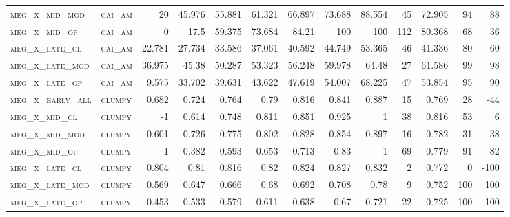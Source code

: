 \begin{landscape}
\begin{center}
\begin{footnotesize}
\begin{longtable}{llrrrrrrrr|rrr}
\textsc{meg\_x\_mid\_mod  } & \textsc{cai\_am   }   & 20       & 45.976   & 55.881   & 61.321   & 66.897   & 73.688   & 88.554    & 45     & 72.905        & 94            & 88              \\
\textsc{meg\_x\_mid\_op   } & \textsc{cai\_am   }   & 0        & 17.5     & 59.375   & 73.684   & 84.21    & 100      & 100       & 112    & 80.368        & 68            & 36              \\
\textsc{meg\_x\_late\_cl  } & \textsc{cai\_am   }   & 22.781   & 27.734   & 33.586   & 37.061   & 40.592   & 44.749   & 53.365    & 46     & 41.336        & 80            & 60              \\
\textsc{meg\_x\_late\_mod } & \textsc{cai\_am   }   & 36.975   & 45.38    & 50.287   & 53.323   & 56.248   & 59.978   & 64.48     & 27     & 61.586        & 99            & 98              \\
\textsc{meg\_x\_late\_op  } & \textsc{cai\_am   }   & 9.575    & 33.702   & 39.631   & 43.622   & 47.619   & 54.007   & 68.225    & 47     & 53.854        & 95            & 90              \\
\textsc{meg\_x\_early\_all} & \textsc{clumpy    }   & 0.682    & 0.724    & 0.764    & 0.79     & 0.816    & 0.841    & 0.887     & 15     & 0.769         & 28            & -44             \\
\textsc{meg\_x\_mid\_cl   } & \textsc{clumpy    }   & -1       & 0.614    & 0.748    & 0.811    & 0.851    & 0.925    & 1         & 38     & 0.816         & 53            & 6               \\
\textsc{meg\_x\_mid\_mod  } & \textsc{clumpy    }   & 0.601    & 0.726    & 0.775    & 0.802    & 0.828    & 0.854    & 0.897     & 16     & 0.782         & 31            & -38             \\
\textsc{meg\_x\_mid\_op   } & \textsc{clumpy    }   & -1       & 0.382    & 0.593    & 0.653    & 0.713    & 0.83     & 1         & 69     & 0.779         & 91            & 82              \\
\textsc{meg\_x\_late\_cl  } & \textsc{clumpy    }   & 0.804    & 0.81     & 0.816    & 0.82     & 0.824    & 0.827    & 0.832     & 2      & 0.772         & 0             & -100            \\
\textsc{meg\_x\_late\_mod } & \textsc{clumpy    }   & 0.569    & 0.647    & 0.666    & 0.68     & 0.692    & 0.708    & 0.78      & 9      & 0.752         & 100           & 100             \\
\textsc{meg\_x\_late\_op  } & \textsc{clumpy    }   & 0.453    & 0.533    & 0.579    & 0.611    & 0.638    & 0.67     & 0.721     & 22     & 0.725         & 100           & 100             \\

\end{longtable}
\end{footnotesize}
\end{center}
\end{landscape}
